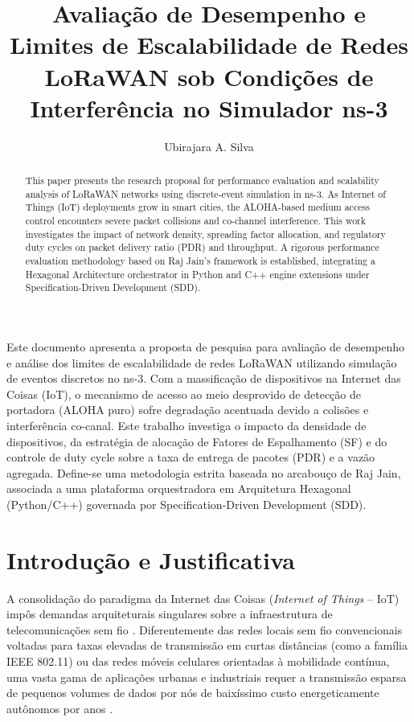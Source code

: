 \documentclass[12pt]{article}
\title{Avaliação de Desempenho e Limites de Escalabilidade de Redes LoRaWAN sob Condições de Interferência no Simulador ns-3}
\author{Ubirajara A. Silva\inst{1}}
\begin{document}
\maketitle

\begin{abstract}
This paper presents the research proposal for performance evaluation and scalability analysis of LoRaWAN networks using discrete-event simulation in ns-3. As Internet of Things (IoT) deployments grow in smart cities, the ALOHA-based medium access control encounters severe packet collisions and co-channel interference. This work investigates the impact of network density, spreading factor allocation, and regulatory duty cycles on packet delivery ratio (PDR) and throughput. A rigorous performance evaluation methodology based on Raj Jain's framework is established, integrating a Hexagonal Architecture orchestrator in Python and C++ engine extensions under Specification-Driven Development (SDD).
\end{abstract}

\begin{resumo}
Este documento apresenta a proposta de pesquisa para avaliação de desempenho e análise dos limites de escalabilidade de redes LoRaWAN utilizando simulação de eventos discretos no ns-3. Com a massificação de dispositivos na Internet das Coisas (IoT), o mecanismo de acesso ao meio desprovido de detecção de portadora (ALOHA puro) sofre degradação acentuada devido a colisões e interferência co-canal. Este trabalho investiga o impacto da densidade de dispositivos, da estratégia de alocação de Fatores de Espalhamento (SF) e do controle de duty cycle sobre a taxa de entrega de pacotes (PDR) e a vazão agregada. Define-se uma metodologia estrita baseada no arcabouço de Raj Jain, associada a uma plataforma orquestradora em Arquitetura Hexagonal (Python/C++) governada por Specification-Driven Development (SDD).
\end{resumo}

\section{Introdução e Justificativa}
\label{sec:introducao}

A consolidação do paradigma da Internet das Coisas (\textit{Internet of Things} -- IoT) impôs demandas arquiteturais singulares sobre a infraestrutura de telecomunicações sem fio \cite{tanenbaum2021redes}. Diferentemente das redes locais sem fio convencionais voltadas para taxas elevadas de transmissão em curtas distâncias (como a família IEEE 802.11) ou das redes móveis celulares orientadas à mobilidade contínua, uma vasta gama de aplicações urbanas e industriais requer a transmissão esparsa de pequenos volumes de dados por nós de baixíssimo custo energeticamente autônomos por anos \cite{stallings2005wireless, adelantado2017understanding}.
\end{document}
